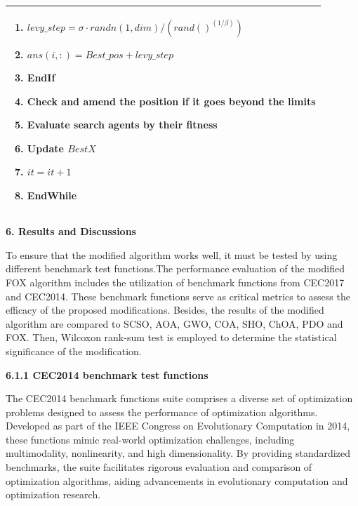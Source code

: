 \documentclass[
]{article}
\begin{document}
\begin{justify}
{\begin{minipage}[t]{\textwidth}
\begin{longtable}{@{}p{\dimexpr\linewidth-2\tabcolsep\relax}@{}}
\begin{minipage}[t]{\linewidth}
\begin{enumerate}
    \item \hspace{1.5cm} $levy\_step = \sigma \cdot randn(1, dim) / (rand()^{(1 / \beta)})$
    \item \hspace{1.5cm} $ans(i, :) = Best\_pos + levy\_step$ 
    \item \hspace{0.5cm} \textbf{EndIf}
    \item \hspace{0.5cm} Check and amend the position if it goes beyond the limits
    \item \hspace{0.5cm} Evaluate search agents by their fitness
    \item \hspace{0.5cm} Update $BestX$
    \item \hspace{0.5cm} $it=it+1$
    \item \textbf{EndWhile}
  \end{enumerate}
  \end{minipage} \\
  \bottomrule
  \end{longtable}
\end{minipage}
\newpage

\def\labelenumi{\arabic{enumi}.}
\item
\vspace{5mm}
  \textbf{6. Results and Discussions}

To ensure that the modified algorithm works well, it must be tested by using different benchmark test functions.The performance evaluation of the modified FOX algorithm includes the utilization of benchmark functions from CEC2017 and CEC2014. These benchmark functions serve as critical metrics to assess the efficacy of the proposed modifications. Besides, the results of the modified algorithm are compared to SCSO, AOA, GWO, COA, SHO, ChOA, PDO and FOX. Then, Wilcoxon rank-sum test is employed to determine the statistical significance of the modification. 

\def\labelenumi{\arabic{enumi}.}
\item
\vspace{5mm}
  \textbf{6.1.1 CEC2014 benchmark test functions}
  
  The CEC2014 benchmark functions suite comprises a diverse set of optimization problems designed to assess the performance of optimization algorithms. Developed as part of the IEEE Congress on Evolutionary Computation in 2014, these functions mimic real-world optimization challenges, including multimodality, nonlinearity, and high dimensionality. By providing standardized benchmarks, the suite facilitates rigorous evaluation and comparison of optimization algorithms, aiding advancements in evolutionary computation and optimization research.

}
\end{justify}
\end{document}
